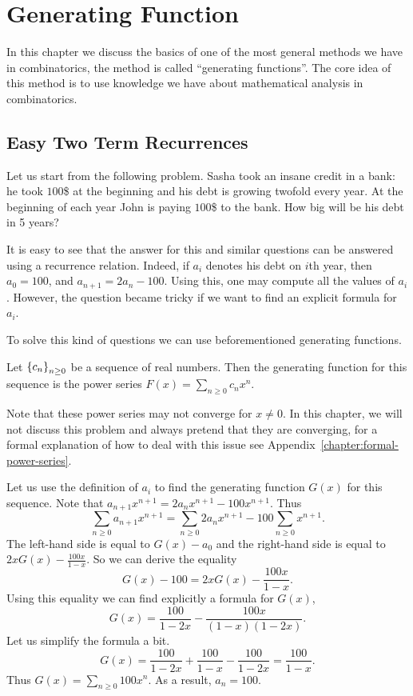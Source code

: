 \chapter{Generating Function}
\label{chapter:generating-functions}
In this chapter we discuss the basics of one of the most general methods we have
in combinatorics, the method is called ``generating functions''. The core idea
of this method is to use knowledge we have about mathematical analysis in
combinatorics.

\section{Easy Two Term Recurrences}
Let us start from the following problem.
Sasha took an insane credit in a bank: he took $100$\$ at the beginning and
his debt is growing twofold every year. At the beginning of each year John is
paying $100$\$ to the bank. How big will be his debt in 5 years?

It is easy to see that the answer for this and similar questions can be answered
using a recurrence relation. Indeed, if $a_i$ denotes his debt on $i$th year,
then $a_0 = 100$, and $a_{n + 1} = 2 a_n - 100$. Using this, one may compute
all the values of $a_i$. However, the question became tricky if we want to
find an explicit formula for $a_i$.

To solve this kind of questions we can use beforementioned generating functions.
\begin{definition}
  Let $\set{c_n}_{n \ge 0}$ be a sequence of real numbers. Then
  the generating function for this sequence is the power series
  $F(x) = \sum_{n \ge 0} c_n x^n$.
\end{definition}
Note that these power series may not converge for $x \neq 0$.
In this chapter, we will not discuss this problem and always pretend that
they are converging, for a formal explanation of how to deal with this issue see
Appendix~\ref{chapter:formal-power-series}.

Let us use the definition of $a_i$ to find the generating function $G(x)$
for this sequence. Note that
$a_{n + 1} x^{n + 1} = 2 a_n x^{n + 1} - 100 x^{n + 1}$. Thus
\[
  \sum_{n \ge 0} a_{n + 1} x^{n + 1} =
    \sum_{n \ge 0} 2 a_n x^{n + 1} - 100 \sum_{n \ge 0} x^{n + 1}.
\]
The left-hand side is equal to $G(x) - a_0$ and the right-hand side is
equal to $2xG(x) - \frac{100 x}{1 - x}$. So we can derive the equality
\[
  G(x) - 100 = 2xG(x) - \frac{100 x}{1 - x}.
\]
Using this equality we can find explicitly a formula for $G(x)$,
\[
  G(x) = \frac{100}{1 - 2x} - \frac{100x}{(1 - x)(1 - 2x)}.
\]
Let us simplify the formula a bit.
\[
  G(x) = \frac{100}{1 - 2x} + \frac{100}{1 - x} - \frac{100}{1 - 2x} =
  \frac{100}{1 - x}.
\]
Thus $G(x) = \sum_{n \ge 0} 100 x^n$. As a result, $a_n = 100$.

